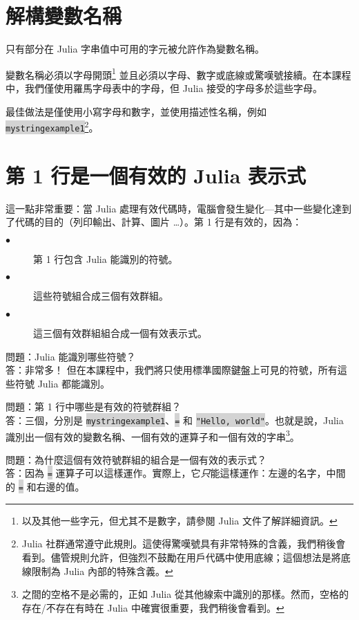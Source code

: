 \documentclass[]{article}
\begin{document}
\section*{解構變數名稱}

只有部分在 Julia 字串值中可用的字元被允許作為變數名稱。

變數名稱必須以字母開頭\footnote{以及其他一些字元，但尤其不是數字，請參閱 Julia 文件了解詳細資訊。} 並且必須以字母、數字或底線或驚嘆號接續。在本課程中，我們僅使用羅馬字母表中的字母，但 Julia 接受的字母多於這些字母。

最佳做法是僅使用小寫字母和數字，並使用描述性名稱，例如 \colorbox{lightgray}{\tt mystringexample1}\footnote{Julia 社群通常遵守此規則。這使得驚嘆號具有非常特殊的含義，我們稍後會看到。儘管規則允許，但強烈不鼓勵在用戶代碼中使用底線；這個想法是將底線限制為 Julia 內部的特殊含義。}。

\section*{第 1 行是一個有效的 Julia 表示式}

這一點非常重要：當 Julia 處理有效代碼時，電腦會發生變化---其中一些變化達到了代碼的目的（列印輸出、計算、圖片 \ldots）。第 1 行是有效的，因為：

\begin{description}
	\item[$\bullet$] 第 1 行包含 Julia 能識別的符號。
	\item[$\bullet$] 這些符號組合成三個有效群組。
	\item[$\bullet$] 這三個有效群組組合成一個有效表示式。
\end{description}

問題：Julia 能識別哪些符號？ \\
答：非常多！ 但在本課程中，我們將只使用標準國際鍵盤上可見的符號，所有這些符號 Julia 都能識別。

問題：第 1 行中哪些是有效的符號群組？\\
答：三個，分別是 \colorbox{lightgray}{\tt mystringexample1}、\colorbox{lightgray}{\tt =} 和 \colorbox{lightgray}{\tt "Hello, world"}。也就是說，Julia 識別出一個有效的變數名稱、一個有效的運算子和一個有效的字串\footnote{之間的空格不是必需的，正如 Julia 從其他線索中識別的那樣。然而，空格的存在/不存在有時在 Julia 中確實很重要，我們稍後會看到。}。

問題：為什麼這個有效符號群組的組合是一個有效的表示式？\\
答：因為 \colorbox{lightgray}{\tt =} 運算子可以這樣運作。實際上，它\emph{只}能這樣運作：左邊的名字，中間的 \colorbox{lightgray}{\tt =} 和右邊的值。
\end{document}
